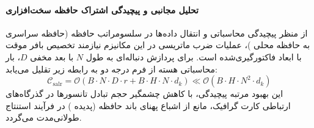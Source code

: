 \paragraph{تحلیل مجانبی و پیچیدگی اشتراک حافظه سخت‌افزاری}
از منظر پیچیدگی محاسباتی و انتقال داده‌ها در سلسومراتب حافظه (حافظه سراسری  به حافظه محلی )، عملیات ضرب ماتریسی در این مکانیزم نیازمند تخصیص بافر موقت با ابعاد فاکتورگیری‌شده است. برای پردازش دنباله‌ای به طول $N$ با بعد مخفی $D$، بار محاسباتی هسته از فرم درجه دو به رابطه زیر تقلیل می‌یابد:
\begin{equation}
\label{eq:complexity_salr}
\mathcal{C}_{\text{salr}} = \mathcal{O}\left( B \cdot N \cdot D \cdot r + B \cdot H \cdot N \cdot d_k \right) \ll \mathcal{O}\left( B \cdot H \cdot N^2 \cdot d_k \right)
\end{equation}
این بهبود مرتبه پیچیدگی، با کاهش چشمگیر حجم تبادل تانسورها در گذرگاه‌های ارتباطی کارت گرافیک، مانع از اشباع پهنای باند حافظه (پدیده ) در فرآیند استنتاج طولانی‌مدت می‌گردد.
